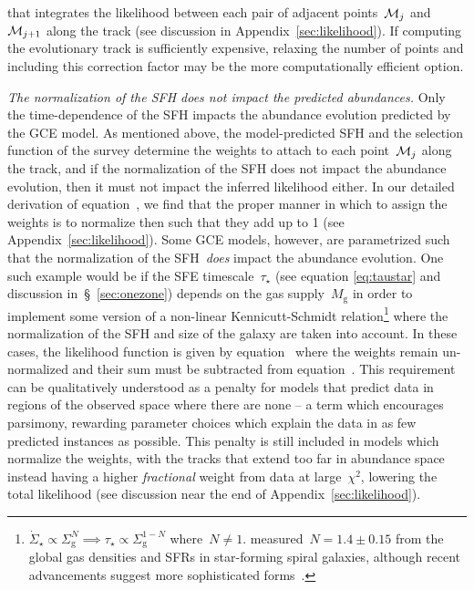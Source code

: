 \documentclass[ms.tex]{subfiles}
\begin{document}
that integrates the likelihood between each pair of adjacent
points~$\mathcal{M}_j$ and~$\mathcal{M}_{j + 1}$ along the track (see discussion
in Appendix~\ref{sec:likelihood}).
If computing the evolutionary track is sufficiently expensive, relaxing the
number of points and including this correction factor may be the more
computationally efficient option.
\par
\textit{The normalization of the SFH does not impact the predicted abundances.}
Only the time-dependence of the SFH impacts the abundance evolution predicted
by the GCE model.
As mentioned above, the model-predicted SFH and the selection function of the
survey determine the weights to attach to each point~$\mathcal{M}_j$ along the
track, and if the normalization of the SFH does not impact the abundance
evolution, then it must not impact the inferred likelihood either.
In our detailed derivation of equation~, we find that the
proper manner in which to assign the weights is to normalize then such that
they add up to 1 (see Appendix~\ref{sec:likelihood}).
Some GCE models, however, are parametrized such that the normalization of the
SFH~\textit{does} impact the abundance evolution.
One such example would be if the SFE timescale~$\tau_\star$ (see equation
\ref{eq:taustar} and discussion in~\S~\ref{sec:onezone}) depends on the gas
supply~$M_\text{g}$ in order to implement some version of a non-linear
Kennicutt-Schmidt relation\footnote{
	$\dot{\Sigma}_\star \propto \Sigma_\text{g}^N \implies \tau_\star \propto
	\Sigma_\text{g}^{1 - N}$ where~$N \neq 1$.
	\citet{Kennicutt1998} measured~$N = 1.4 \pm 0.15$ from the global gas
	densities and SFRs in star-forming spiral galaxies, although recent
	advancements suggest more sophisticated forms~\citep[e.g.,][]{Krumholz2018}.
} where the normalization of the SFH and size of the galaxy are taken into
account.
In these cases, the likelihood function is given by
equation~ where the weights remain un-normalized and
their sum must be subtracted from equation~.
This requirement can be qualitatively understood as a penalty for models that
predict data in regions of the observed space where there are none -- a term
which encourages parsimony, rewarding parameter choices which explain the data
in as few predicted instances as possible.
This penalty is still included in models which normalize the weights, with the
tracks that extend too far in abundance space instead having a higher
\textit{fractional} weight from data at large~$\chi^2$, lowering the total
likelihood (see discussion near the end of Appendix~\ref{sec:likelihood}).
\end{document}
